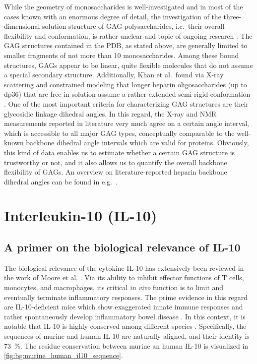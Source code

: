 While the geometry of monosaccharides is well-investigated and in most of the
cases known with an enormous degree of detail, the investigation of the
three-dimensional solution structure of GAG polysaccharides, i.e.\ their overall
flexibility and conformation, is rather unclear and topic of ongoing research
\cite{structure_gags_progess_perspectives_2010}. The GAG structures contained in
the PDB, as stated above, are generally limited to smaller fragments of not more
than 10 monosaccharides. Among these bound structures, GAGs appear to be linear,
quite flexible molecules that do not assume a special secondary structure.
Additionally, Khan et al.\ found via X-ray scattering and constrained modeling
that longer heparin oligosaccharides (up to dp36) that are free in solution
assume a rather extended semi-rigid conformation
\cite{semi_rigid_heparin_structures_2010}. One of the most important criteria
for characterizing GAG structures are their glycosidic linkage dihedral angles.
In this regard, the X-ray and NMR measurements reported in literature very much
agree on a certain angle interval, which is accessible to all major GAG types,
conceptually comparable to the well-known backbone dihedral angle intervals
which are valid for proteins. Obviously, this kind of data enables us to
estimate whether a certain GAG structure is trustworthy or not, and it also
allows us to quantify the overall backbone flexibility of GAGs. An overview on
literature-reported heparin backbone dihedral angles can be found in e.g.\
\cite{semi_rigid_heparin_structures_2010}.


\section{Interleukin-10 (IL-10)}


\subsection{A primer on the biological relevance of IL-10}
\label{background:il10biologyprimer}

The biological relevance of the cytokine IL-10 has extensively been reviewed in
the work of Moore et al. \cite{moore_2001}. Via its ability to inhibit effector
functions of T cells, monocytes, and macrophages, its critical
\textit{in vivo} function is to limit and eventually terminate inflammatory
responses. The prime evidence in this regard are IL-10-deficient mice which show
exaggerated innate immune responses and rather spontaneously develop
inflammatory bowel disease \cite{mueller_il10defmouse_1993,
roers_il10_mice_2004,rubtsov_il10_mice_2008}. In this context, it is notable
that IL-10 is highly conserved among different species
\cite{il10_dna_rabiit_2000, porcine_il10_1995}. Specifically, the sequences
of murine and human IL-10 are naturally aligned, and their identity is
\SI{73}{\percent}. The residue conservation between murine an human IL-10 is
visualized in \cref{fig:bg:murine_human_il10_sequence}.

